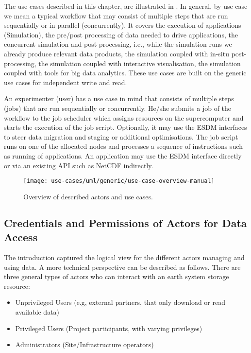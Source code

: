 \medskip

The use cases described in this chapter, are illustrated in .
In general, by use case we mean a typical workflow that may consist of multiple steps that are run sequentially or in parallel (concurrently).
It covers the execution of applications (Simulation),
the pre/post processing of data needed to drive applications,
the concurrent simulation and post-processing, i.e., while the simulation runs we already produce relevant data products,
the simulation coupled with in-situ post-processing,
the simulation coupled with interactive visualisation,
the simulation coupled with tools for big data analytics.
These use cases are built on the generic use cases for independent write and read.


An experimenter (user) has a use case in mind that consists of multiple steps (jobs) that are run sequentially or concurrently.
He/she submits a job of the workflow to the job scheduler which assigns resources on the supercomputer and starts the execution of the job script.
Optionally, it may use the ESDM interfaces to steer data migration and staging or additional optimisations.
The job script runs on one of the allocated nodes and processes a sequence of instructions such as running of applications.
An application may use the ESDM interface directly or via an existing API such as NetCDF indirectly.




\begin{figure}
	\centering
	\texttt{[image: use-cases/uml/generic/use-case-overview-manual]}
	\caption{Overview of described actors and use cases.}
	\label{fig:overview-actors-use-cases}
\end{figure}





\subsection{Credentials and Permissions of Actors for Data Access}

The introduction captured the logical view for the different actors managing and using data.
A more technical perspective can be described as follows.
There are three general types of actors who can interact with an earth system storage resource:

\begin{itemize}
	\item Unprivileged Users (e.g, external partners, that only download or read available data)
	\item Privileged Users (Project participants, with varying privileges)
	\item Administrators (Site/Infrastructure operators)
\end{itemize}

